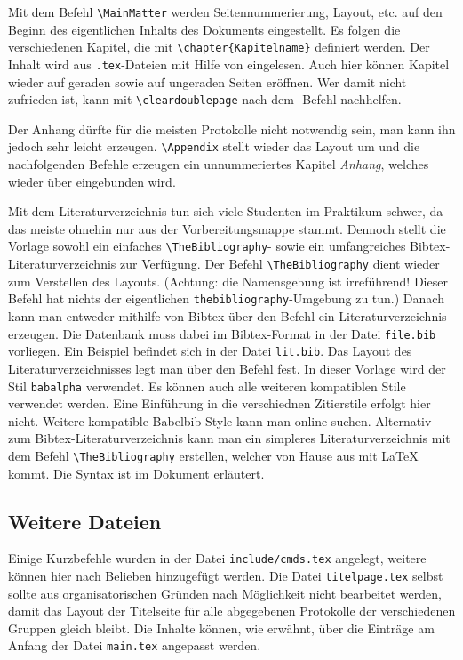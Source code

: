 Mit dem Befehl \verb|\MainMatter| werden Seitennummerierung, Layout, etc. auf 
den Beginn des eigentlichen Inhalts des Dokuments eingestellt. Es folgen die 
verschiedenen Kapitel, die mit \verb|\chapter{Kapitelname}| definiert werden. 
Der Inhalt wird aus \verb|.tex|-Dateien mit Hilfe von \verb|| 
eingelesen. Auch hier können Kapitel wieder auf geraden sowie auf ungeraden 
Seiten eröffnen. Wer damit nicht zufrieden ist, kann mit \verb|\cleardoublepage| 
nach dem \verb||-Befehl nachhelfen.

Der Anhang dürfte für die meisten Protokolle nicht notwendig sein, man kann ihn 
jedoch sehr leicht erzeugen. \verb|\Appendix| stellt wieder das Layout um und 
die nachfolgenden Befehle erzeugen ein unnummeriertes Kapitel \textit{Anhang}, 
welches wieder über \verb|| eingebunden wird.

Mit dem Literaturverzeichnis tun sich viele Studenten im Praktikum schwer, da 
das meiste ohnehin nur aus der Vorbereitungsmappe stammt. Dennoch stellt die 
Vorlage sowohl ein einfaches \verb|\TheBibliography|- sowie ein umfangreiches 
Bibtex-Literaturverzeichnis zur Verfügung. Der Befehl \verb|\TheBibliography| 
dient wieder zum Verstellen des Layouts. (Achtung: die Namensgebung ist 
irreführend! Dieser Befehl hat nichts der eigentlichen 
\verb|thebibliography|-Umgebung zu tun.) Danach kann man entweder mithilfe von 
Bibtex über den Befehl \verb|| ein Literaturverzeichnis 
erzeugen. Die Datenbank muss dabei im Bibtex-Format in der Datei \verb|file.bib| 
vorliegen. Ein Beispiel befindet sich in der Datei \verb|lit.bib|. Das Layout 
des Literaturverzeichnisses legt man über den Befehl 
\verb|| fest. In dieser Vorlage wird der Stil 
\verb|babalpha| verwendet. Es können auch alle weiteren kompatiblen Stile 
verwendet werden. Eine Einführung in die verschiednen Zitierstile erfolgt  hier 
nicht. Weitere kompatible Babelbib-Style kann man online suchen. Alternativ zum 
Bibtex-Literaturverzeichnis kann man ein simpleres Literaturverzeichnis mit dem 
Befehl \verb|\TheBibliography| erstellen, welcher von Hause aus mit LaTeX kommt. 
Die Syntax ist im Dokument erläutert.

\subsection{Weitere Dateien}
Einige Kurzbefehle wurden in der Datei \verb|include/cmds.tex| 
angelegt, weitere können hier nach Belieben hinzugefügt werden. Die Datei 
\verb|titelpage.tex| selbst sollte aus organisatorischen Gründen nach 
Möglichkeit nicht bearbeitet werden, damit das Layout der Titelseite für alle 
abgegebenen Protokolle der verschiedenen Gruppen gleich bleibt. Die Inhalte 
können, wie erwähnt, über die Einträge am Anfang der Datei \verb|main.tex| 
angepasst werden.

